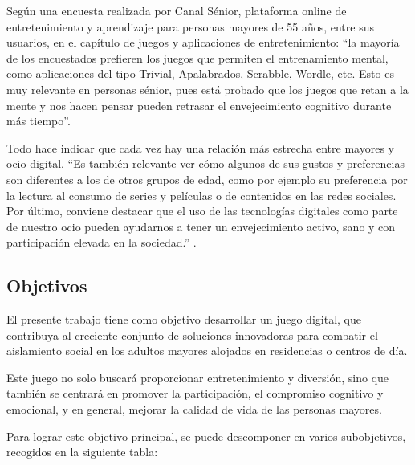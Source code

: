 Según una encuesta realizada por Canal Sénior, plataforma online de entretenimiento y aprendizaje para personas mayores de 55 años, entre sus usuarios, en el capítulo de juegos y aplicaciones de entretenimiento: \enquote{la mayoría de los encuestados prefieren los juegos que permiten el entrenamiento mental, como aplicaciones del tipo Trivial, Apalabrados, Scrabble, Wordle, etc. Esto es muy relevante en personas sénior, pues está probado que los juegos que retan a la mente y nos hacen pensar pueden retrasar el envejecimiento cognitivo durante más tiempo}.

Todo hace indicar que cada vez hay una relación más estrecha entre mayores y ocio digital. \enquote{Es también relevante ver cómo algunos de sus gustos y preferencias son diferentes a los de otros grupos de edad, como por ejemplo su preferencia por la lectura al consumo de series y películas o de contenidos en las redes sociales. Por último, conviene destacar que el uso de las tecnologías digitales como parte de nuestro ocio pueden ayudarnos a tener un envejecimiento activo, sano y con participación elevada en la sociedad.} \parencite{intro6}.

\subsection{Objetivos}
El presente trabajo tiene como objetivo desarrollar un juego digital, que contribuya al creciente conjunto de soluciones innovadoras para combatir el aislamiento social en los adultos mayores alojados en residencias o centros de día.

Este juego no solo buscará proporcionar entretenimiento y diversión, sino que también se centrará en promover la participación, el compromiso cognitivo y emocional, y en general, mejorar la calidad de vida de las personas mayores. 

Para lograr este objetivo principal, se puede descomponer en varios subobjetivos, recogidos en la siguiente tabla:

